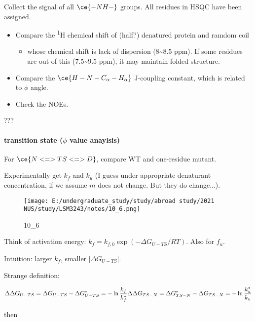 \documentclass[]{article}
\let\oldparagraph\paragraph
\renewcommand{\paragraph}[1]{\oldparagraph{#1}\mbox{}}
\begin{document}
Collect the signal of all \(\ce{-NH-}\) groups. All residues in HSQC
have been assigned.

\begin{itemize}
\item
  Compare the \textsuperscript{1}H chemical shift of (half?) denatured
  protein and ramdom coil

  \begin{itemize}
  \item
    whose chemical shift is lack of dispersion (8\textasciitilde{}8.5
    ppm). If some residues are out of this (7.5\textasciitilde{}9.5
    ppm), it may maintain folded structure.
  \end{itemize}
\item
  Compare the \(\ce{H-N-C_\alpha-H_\alpha}\) J-coupling constant, which
  is related to \(\phi\) angle.
\item
  Check the NOEs.
\end{itemize}

???

\hypertarget{transition-state--value-anaylsis}{%
\paragraph{\texorpdfstring{transition state (\(\phi\) value
anaylsis)}{transition state (\textbackslash{}phi value anaylsis)}}\label{transition-state--value-anaylsis}}

For \(\ce{N<=>TS<=>D}\), compare WT and one-residue mutant.

Experimentally get \(k_f\) and \(k_u\) (I guess under appropriate
denaturant concentration, if we assume \(m\) does not change. But they
do change...).

\begin{figure}
\centering
\texttt{[image: E:/undergraduate\_study/study/abroad study/2021 NUS/study/LSM3243/notes/10\_6.png]}
\caption{10\_6}
\end{figure}

Think of activation energy: \(k_f=k_{f,0}\exp(-\Delta G_{U-TS}/RT)\).
Also for \(f_u\).

Intuition: larger \(k_f\), smaller \(|\Delta G_{U-TS}|\).

Strange definition:

\[\Delta\Delta G_{U-TS}=\Delta G_{U-TS}-\Delta G^*_{U-TS}=-\ln\dfrac{k_f}{k_f^*}\\
\Delta\Delta G_{TS-N}=\Delta G^*_{TS-N}-\Delta G_{TS-N}=-\ln\dfrac{k_u^*}{k_u}\]

then
\end{document}
